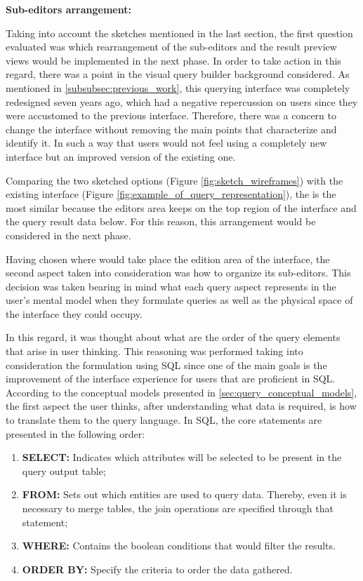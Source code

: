 \medskip

\textbf{Sub-editors arrangement:}

\medskip

Taking into account the sketches mentioned in the last section, the first question evaluated was which rearrangement of the sub-editors and the result preview views would be implemented in the next phase. In order to take action in this regard, there was a point in the visual query builder background considered. As mentioned in \ref{subsubsec:previous_work}, this querying interface was completely redesigned seven years ago, which had a negative repercussion on users since they were accustomed to the previous interface. Therefore, there was a concern to change the interface without removing the main points that characterize and identify it. In such a way that users would not feel using a completely new interface but an improved version of the existing one.

Comparing the two sketched options (Figure \ref{fig:sketch_wireframes}) with the existing interface (Figure \ref{fig:example_of_query_representation}), the  is the most similar because the editors area keeps on the top region of the interface and the query result data below. For this reason, this arrangement would be considered in the next phase.

Having chosen where would take place the edition area of the interface, the second aspect taken into consideration was how to organize its sub-editors. This decision was taken bearing in mind what each query aspect represents in the user's mental model when they formulate queries as well as the physical space of the interface they could occupy.

In this regard, it was thought about what are the order of the query elements that arise in user thinking. This reasoning was performed taking into consideration the formulation using \gls{SQL} since one of the main goals is the improvement of the interface experience for users that are proficient in \gls{SQL}. According to the conceptual models presented in \ref{sec:query_conceptual_models}, the first aspect the user thinks, after understanding what data is required, is how to translate them to the query language. In \gls{SQL}, the core statements are presented in the following order:

\begin{enumerate}
  \item \textbf{SELECT: }Indicates which attributes will be selected to be present in the query output table;
  \item \textbf{FROM: }Sets out which entities are used to query data. Thereby, even it is necessary to merge tables, the join operations are specified through that statement;
  \item \textbf{WHERE: }Contains the boolean conditions that would filter the results.
  \item \textbf{ORDER BY: }Specify the criteria to order the data gathered.
\end{enumerate}


